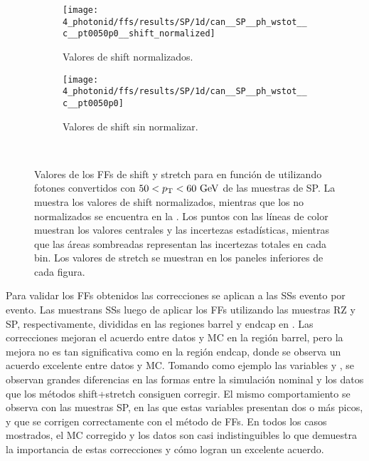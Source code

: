 \begin{figure}[ht!]
    \centering
    \begin{subfigure}[h]{0.49\linewidth}
        \centering
        \texttt{[image: 4\_photonid/ffs/results/SP/1d/can\_\_SP\_\_ph\_wstot\_\_c\_\_pt0050p0\_\_shift\_normalized]}
        \caption{Valores de shift normalizados.}
        \label{fig:ss_corrections:ffs:reslts:ffs_eta_wstot:normalised_shift}
    \end{subfigure}
    \hfill
    \begin{subfigure}[h]{0.49\linewidth}
        \centering
        \texttt{[image: 4\_photonid/ffs/results/SP/1d/can\_\_SP\_\_ph\_wstot\_\_c\_\_pt0050p0]}
        \caption{Valores de shift sin normalizar.}
        \label{fig:ss_corrections:ffs:reslts:ffs_eta_wstot:raw_shift}
    \end{subfigure}\\
    \caption{Valores de los \acp{FF} de shift y stretch para \wstot en función de \abseta utilizando fotones convertidos con \(50<p_{\text{T}}<60~\text{GeV}\) de las muestras de \ac{SP}. La  muestra los valores de shift normalizados, mientras que los no normalizados se encuentra en la . Los puntos con las líneas de color muestran los valores centrales y las incertezas estadísticas, mientras que las áreas sombreadas representan las incertezas totales en cada bin. Los valores de stretch se muestran en los paneles inferiores de cada figura.}
    \label{fig:ss_corrections:ffs:reslts:ffs_eta_wstot}
\end{figure}


Para validar los \acp{FF} obtenidos las correcciones se aplican a las \acp{SS} evento por evento.
Las \Figs{\ref{fig:ss_corrections:ffs:results:ss_rz}}{\ref{fig:ss_corrections:ffs:results:ss_sp}} muestrans \acp{SS} luego de aplicar los \acp{FF} utilizando las muestras \ac{RZ} y \ac{SP}, respectivamente, divididas en las regiones barrel y endcap en \abseta. Las correcciones mejoran el acuerdo entre datos y \ac{MC} en la región barrel, pero la mejora no es tan significativa como en la región endcap, donde se observa un acuerdo excelente entre datos y \ac{MC}. Tomando como ejemplo las variables \wone y \wstot, se observan grandes diferencias en las formas entre la simulación nominal y los datos que los métodos shift+stretch consiguen corregir. El mismo comportamiento se observa con las muestras \ac{SP}, en las que estas variables presentan dos o más picos, y que se corrigen correctamente con el método de \acp{FF}. En todos los casos mostrados, el \ac{MC} corregido y los datos son casi indistinguibles lo que demuestra la importancia de estas correcciones y cómo logran un excelente acuerdo.

